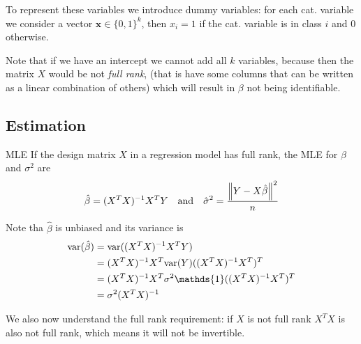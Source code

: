 \documentclass[12pt]{extarticle}
\renewcommand{\vec}[1]{\bm{#1}}
\begin{document}
To represent these variables we introduce dummy variables:
for each cat. variable we consider a vector $\vec x \in \{ 0, 1\}^k$,
then $x_i = 1$ if the cat. variable is in class $i$ and $0$ otherwise.

Note that if we have an intercept we cannot add all $k$ variables, because then the matrix $X$
would be not \emph{full rank},
(that is have some columns that can be written as a linear combination of others)
which will result in $\beta$ not being identifiable.

\subsection{Estimation}

\begin{theorem}{MLE}{}
	If the design matrix $X$ in a regression model has full rank, the MLE for $\beta$ and $\sigma^2$ are
	\begin{equation}
		\hat \beta = (X^T X)^{-1} X^T Y \quad \text{and} \quad \hat \sigma^2 = \frac{\norm{Y - X \hat \beta}^2}{n}
	\end{equation}
\end{theorem}

Note tha $\hat \beta$ is unbiased and its variance is
\begin{align}
	\var(\hat \beta ) & = \var((X^T X)^{-1} X^T Y)                                 \\
	                  & = (X^T X)^{-1}X^T \var(Y) ((X^T X)^{-1} X^T)^T             \\
	                  & = (X^T X)^{-1}X^T \sigma^2 \mathds{1} ((X^T X)^{-1} X^T)^T \\
	                  & = \sigma^2 (X^T X)^{-1}
\end{align}

We also now understand the full rank requirement: if $X$ is not full rank $X^T X$ is also not full rank,
which means it will not be invertible.
\end{document}
